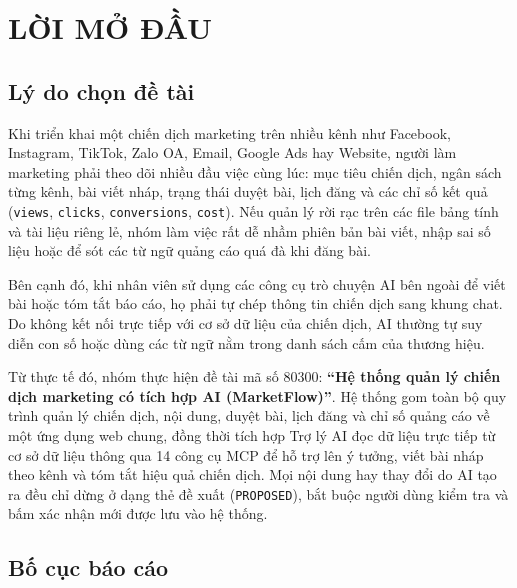 \chapter*{LỜI MỞ ĐẦU}

\section*{Lý do chọn đề tài}

Khi triển khai một chiến dịch marketing trên nhiều kênh như Facebook, Instagram, TikTok, Zalo OA, Email, Google Ads hay Website, người làm marketing phải theo dõi nhiều đầu việc cùng lúc: mục tiêu chiến dịch, ngân sách từng kênh, bài viết nháp, trạng thái duyệt bài, lịch đăng và các chỉ số kết quả (\texttt{views}, \texttt{clicks}, \texttt{conversions}, \texttt{cost}). Nếu quản lý rời rạc trên các file bảng tính và tài liệu riêng lẻ, nhóm làm việc rất dễ nhầm phiên bản bài viết, nhập sai số liệu hoặc để sót các từ ngữ quảng cáo quá đà khi đăng bài.

Bên cạnh đó, khi nhân viên sử dụng các công cụ trò chuyện AI bên ngoài để viết bài hoặc tóm tắt báo cáo, họ phải tự chép thông tin chiến dịch sang khung chat. Do không kết nối trực tiếp với cơ sở dữ liệu của chiến dịch, AI thường tự suy diễn con số hoặc dùng các từ ngữ nằm trong danh sách cấm của thương hiệu.

Từ thực tế đó, nhóm thực hiện đề tài mã số 80300: \textbf{``Hệ thống quản lý chiến dịch marketing có tích hợp AI (MarketFlow)''}. Hệ thống gom toàn bộ quy trình quản lý chiến dịch, nội dung, duyệt bài, lịch đăng và chỉ số quảng cáo về một ứng dụng web chung, đồng thời tích hợp Trợ lý AI đọc dữ liệu trực tiếp từ cơ sở dữ liệu thông qua 14 công cụ MCP để hỗ trợ lên ý tưởng, viết bài nháp theo kênh và tóm tắt hiệu quả chiến dịch. Mọi nội dung hay thay đổi do AI tạo ra đều chỉ dừng ở dạng thẻ đề xuất (\texttt{PROPOSED}), bắt buộc người dùng kiểm tra và bấm xác nhận mới được lưu vào hệ thống.

\section*{Bố cục báo cáo}

